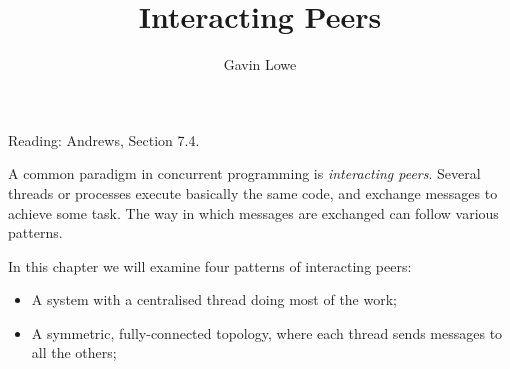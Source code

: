 \documentclass[notes,color]{sepslide0}
\title{Interacting Peers}
\author{Gavin Lowe}
\begin{document}
\begin{slide}
  
  \Title

Reading: Andrews, Section 7.4.

\end{slide}



\begin{slide}

A common paradigm in concurrent programming is \emph{interacting peers}.
Several threads or processes execute basically the same code, and exchange
messages to achieve some task.  The way in which messages are exchanged can
follow various patterns.
\end{slide}


\begin{slide}

In this chapter we will examine four patterns of interacting peers: 
%
\begin{itemize}
\item
A system with a centralised thread doing most of the work;
\begin{center}
\end{center}

\item
A symmetric, fully-connected topology, where each thread sends messages to
all the others;
\begin{center}
\end{center}
\end{itemize}
\end{slide}
\end{document}
